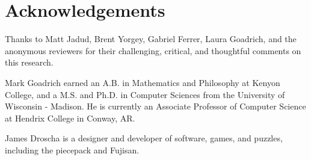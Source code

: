 \documentclass[journal]{IEEEtran}
\begin{document}
%

%

\section*{Acknowledgements}
\noindent	
Thanks to Matt Jadud, Brent Yorgey, Gabriel Ferrer, Laura Goadrich, and the anonymous reviewers for their challenging, critical, and thoughtful comments on this research.
%

%



%
%
\ifCLASSOPTIONcaptionsoff
  \newpage
\fi



%
%
%
%
%
%
%

%

%
%
%
%
%

%

%
%
%
%
%
%
%
%
%
%
%
%

\begin{IEEEbiography}{Mark Goadrich} earned an A.B. in Mathematics and Philosophy at Kenyon College, and a M.S. and Ph.D. in Computer Sciences from the University of Wisconsin - Madison.
He is currently an Associate Professor of Computer Science at Hendrix College in Conway, AR.
\end{IEEEbiography}

%
\begin{IEEEbiography}{James Droscha}
is a designer and developer of software, games, and puzzles, including the piecepack and Fujisan.
\end{IEEEbiography}

%
%
%

%
%
%
%
%

\vfill

%
%
%



%
\end{document}
